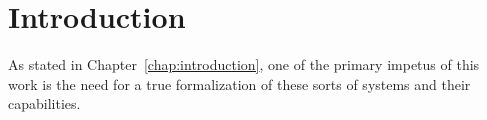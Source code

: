 \section{Introduction}

As stated in Chapter~\ref{chap:introduction}, one of the primary impetus
of this work is the need for a true formalization of these sorts of
systems and their capabilities. 